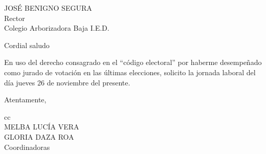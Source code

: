 \documentclass[letterpaper,spanish]{letter}
\begin{document}
\begin{letter}{JOSÉ BENIGNO SEGURA\\Rector\\Colegio Arborizadora Baja I.E.D.}

\opening{Cordial saludo}
En uso del derecho consagrado en el ``código electoral'' por haberme desempeñado como jurado de votación en las últimas elecciones, solicito la jornada laboral del día jueves 26 de noviembre del presente. 

\closing{Atentamente,}

cc{\\MELBA LUCÍA VERA\\GLORIA DAZA ROA\\Coordinadoras}

\end{letter}
\end{document}
